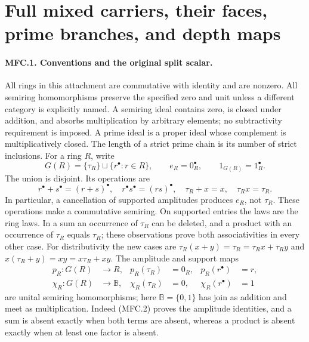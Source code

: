 \providecommand{\Chi}{\mathrm{X}}
\section{Full mixed carriers, their faces, prime branches, and depth maps}
\label{CFStage:sec:MFC}

\paragraph{MFC.1. Conventions and the original split scalar.}
All rings in this attachment are commutative with identity and are nonzero.
All semiring homomorphisms preserve the specified zero and unit unless a
different category is explicitly named. A semiring ideal contains zero, is
closed under addition, and absorbs multiplication by arbitrary elements;
no subtractivity requirement is imposed. A prime ideal is a proper ideal
whose complement is multiplicatively closed. The length of a strict prime
chain is its number of strict inclusions.
For a ring \(R\), write
\[
 G(R)=\{\tau_R\}\sqcup\{r^\bullet:r\in R\},\qquad
 e_R=0_R^\bullet,\qquad 1_{G(R)}=1_R^\bullet.                 \tag{MFC.1}
\]
The union is disjoint. Its operations are
\[
 r^\bullet+s^\bullet=(r+s)^\bullet,\quad
 r^\bullet s^\bullet=(rs)^\bullet,\quad
 \tau_R+x=x,\quad \tau_Rx=\tau_R.
                                                               \tag{MFC.2}
\]
In particular, a cancellation of supported amplitudes produces \(e_R\),
not \(\tau_R\).
These operations make a commutative semiring. On supported entries the
laws are the ring laws. In a sum an occurrence of \(\tau_R\) can be deleted,
and a product with an occurrence of \(\tau_R\) equals \(\tau_R\); these
observations prove both associativities in every other case. For
distributivity the new cases are
\(\tau_R(x+y)=\tau_R=\tau_Rx+\tau_Ry\) and
\(x(\tau_R+y)=xy=x\tau_R+xy\).
The amplitude and support maps
\[
 \begin{aligned}
 p_R:G(R)&\longrightarrow R,&
 p_R(\tau_R)&=0_R,& p_R(r^\bullet)&=r,\\
 \chi_R:G(R)&\longrightarrow\mathbb B,&
 \chi_R(\tau_R)&=0,&\chi_R(r^\bullet)&=1
 \end{aligned}                                           \tag{MFC.3}
\]
are unital semiring homomorphisms; here
\(\mathbb B=\{0,1\}\) has join as addition and meet as multiplication.
Indeed (MFC.2) proves the amplitude identities, and a sum is absent
exactly when both terms are absent, whereas a product is absent exactly
when at least one factor is absent.

